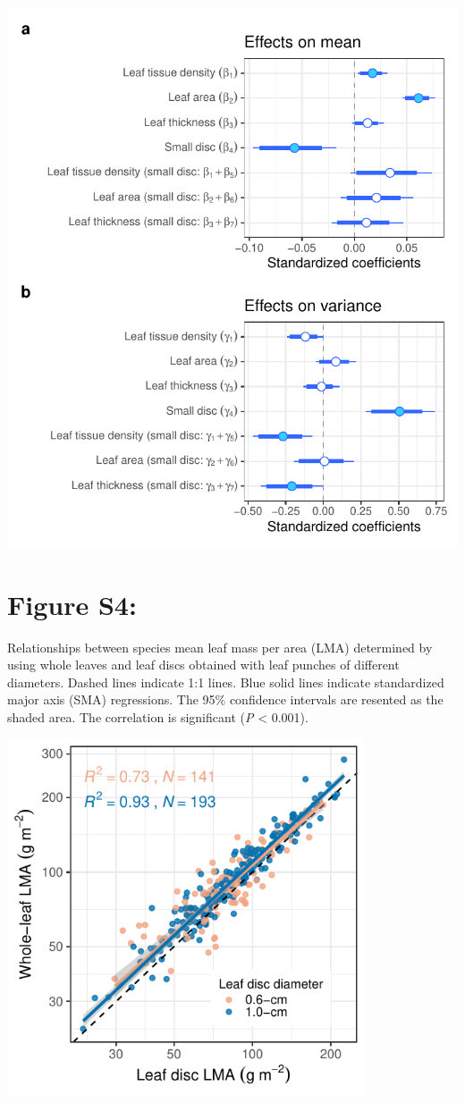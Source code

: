 \documentclass[
  12pt,
]{article}
\begin{document}
\includegraphics{../figs/coef_sp_punch1_add.pdf}

\newpage

\hypertarget{figure-s4}{%
\section{Figure S4:}\label{figure-s4}}

Relationships between species mean leaf mass per area (LMA) determined by using whole leaves and leaf discs obtained with leaf punches of different diameters.
Dashed lines indicate 1:1 lines.
Blue solid lines indicate standardized major axis (SMA) regressions.
The 95\% confidence intervals are resented as the shaded area.
The correlation is significant (\emph{P} \textless{} 0.001).

\includegraphics[width=4.16667in,height=\textheight]{../figs/sma_sep.pdf}
\end{document}
